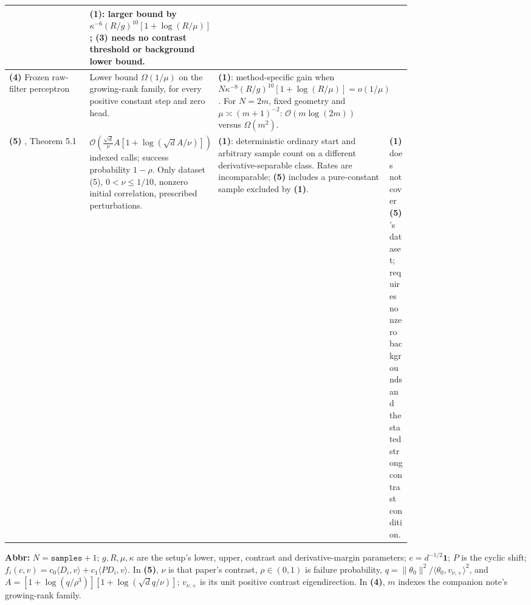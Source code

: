\begin{table}[tp]
\begin{threeparttable}
\begin{tabularx}{\linewidth}{@{}>{\raggedright\arraybackslash}p{0.20\linewidth}>{\raggedright\arraybackslash}p{0.32\linewidth}>{\raggedright\arraybackslash}p{0.25\linewidth}>{\raggedright\arraybackslash}X@{}}
& \textbf{(1)}: larger bound by $\kappa^{-6}(R/g)^{10}[1+\log(R/\mu)]$; \textbf{(3)} needs no contrast threshold or background lower bound. \\
\midrule
\textbf{(4)} Frozen raw-filter perceptron \citep{dcpCompanion}
& Lower bound $\Omega(1/\mu)$ on the growing-rank family, for every positive constant step and zero head.
& \textbf{(1)}: method-specific gain when $N\kappa^{-8}(R/g)^{10}[1+\log(R/\mu)]=o(1/\mu)$. For $N=2m$, fixed geometry and $\mu\asymp(m+1)^{-2}$: $\mathcal{O}(m\log(2m))$ versus $\Omega(m^2)$.
& \\
\midrule
\textbf{(5)} \citep{dcpTyurinV2}, Theorem 5.1
& $\mathcal{O}\!\left(\frac{\sqrt d}{\nu}A[1+\log(\sqrt d A/\nu)]\right)$ indexed calls; success probability $1-\rho$. Only dataset (5), $0<\nu\le1/10$, nonzero initial correlation, prescribed perturbations.
& \textbf{(1)}: deterministic ordinary start and arbitrary sample count on a different derivative-separable class. Rates are incomparable; \textbf{(5)} includes a pure-constant sample excluded by \textbf{(1)}.
& \textbf{(1)} does not cover \textbf{(5)}'s dataset; requires nonzero backgrounds and the stated strong contrast condition. \\
\bottomrule
\end{tabularx}
\begin{tablenotes}[flushleft]\footnotesize
\item[] \textbf{Abbr:} $N=\mathtt{samples}+1$; $g,R,\mu,\kappa$ are the setup's lower, upper, contrast and derivative-margin parameters; $e=d^{-1/2}\mathbf1$; $P$ is the cyclic shift; $f_i(c,v)=c_0\langle D_i,v\rangle+c_1\langle PD_i,v\rangle$. In \textbf{(5)}, $\nu$ is that paper's contrast, $\rho\in(0,1)$ is failure probability, $q=\|\theta_0\|^2/\langle\theta_0,v_{\nu,+}\rangle^2$, and $A=[1+\log(q/\rho^3)][1+\log(\sqrt d q/\nu)]$; $v_{\nu,+}$ is its unit positive contrast eigendirection. In \textbf{(4)}, $m$ indexes the companion note's growing-rank family.
\end{tablenotes}
\end{threeparttable}
\end{table}
\clearpage
